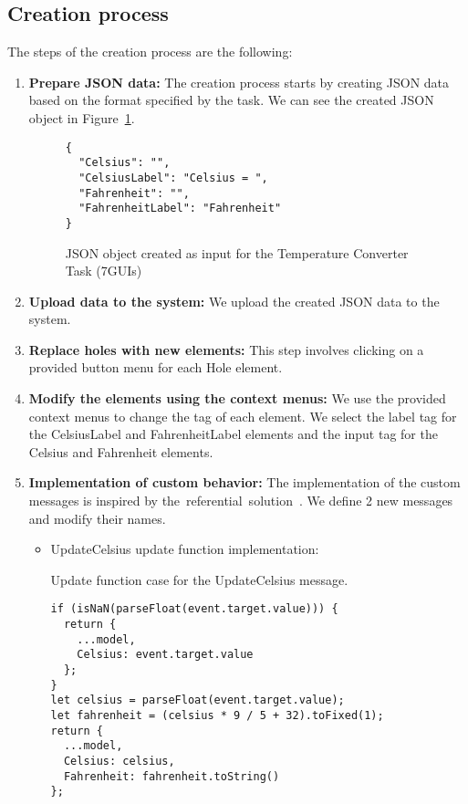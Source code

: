 \subsection {Creation process}
The steps of the creation process are the following:
\begin{enumerate}
	\item \textbf{Prepare JSON data:} The creation process starts by creating JSON data based on the format specified by the task.
	      We can see the created JSON object in Figure~\ref{fig:temp-json}.
	      \begin{figure}[H]
		      \caption{JSON object created as input for the Temperature Converter Task (7GUIs)}
		      \centering
		      \label{fig:temp-json}
		      \begin{lstlisting}
{
  "Celsius": "",
  "CelsiusLabel": "Celsius = ",
  "Fahrenheit": "",
  "FahrenheitLabel": "Fahrenheit"
}
    \end{lstlisting}
	      \end{figure}
	\item \textbf{Upload data to the system:} We upload the created JSON data to the system.
	\item \textbf{Replace holes with new elements:} This step involves clicking on a provided button menu for each Hole element.
	\item \textbf{Modify the elements using the context menus:} We use the provided context menus to change the tag of each element.
	      We select the label tag for the CelsiusLabel and FahrenheitLabel elements and the input tag for the Celsius and Fahrenheit elements.
	\item \textbf{Implementation of custom behavior:} The implementation of the custom messages is inspired by the~referential~solution~\cite{7guis-React-TypeScript-MobX/src/app/guis/tempconv.tsx}. We define 2 new messages and modify their names.
	      \begin{itemize}
		      \item UpdateCelsius update function implementation:
		            \begin{listing}[htbp]
			            \caption{Update function case for the UpdateCelsius message.}
			            \begin{lstlisting}
if (isNaN(parseFloat(event.target.value))) {
  return {
    ...model,
    Celsius: event.target.value
  };
}
let celsius = parseFloat(event.target.value);
let fahrenheit = (celsius * 9 / 5 + 32).toFixed(1);
return {
  ...model,
  Celsius: celsius,
  Fahrenheit: fahrenheit.toString()
};            \end{lstlisting}
		            \end{listing}


\end{itemize}
\end{enumerate}
